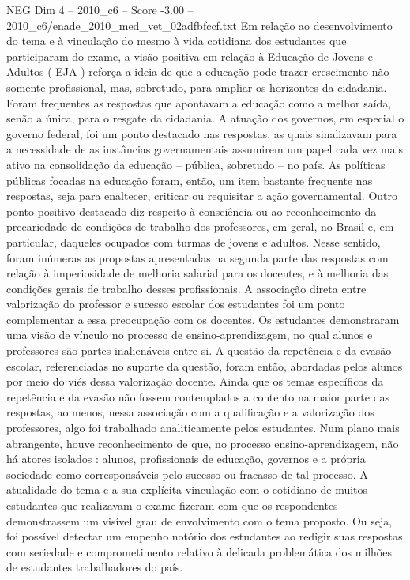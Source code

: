 \begin{textsample}{NEG Dim 4 – 2010\_c6 – Score -3.00 – 2010\_c6/enade\_2010\_med\_vet\_02adfbfccf.txt}
Em relação ao desenvolvimento do tema e à vinculação do mesmo à vida cotidiana dos estudantes que participaram do exame, a visão positiva em relação à Educação de Jovens e Adultos ( EJA ) reforça a ideia de que a educação pode trazer crescimento não somente profissional, mas, sobretudo, para ampliar os horizontes da cidadania.
Foram frequentes as respostas que apontavam a educação como a melhor saída, senão a única, para o resgate da cidadania.
A atuação dos governos, em especial o governo federal, foi um ponto destacado nas respostas, as quais sinalizavam para a necessidade de as instâncias governamentais assumirem um papel cada vez mais ativo na consolidação da educação – pública, sobretudo – no país.
As políticas públicas focadas na educação foram, então, um item bastante frequente nas respostas, seja para enaltecer, criticar ou requisitar a ação governamental.
Outro ponto positivo destacado diz respeito à consciência ou ao reconhecimento da precariedade de condições de trabalho dos professores, em geral, no Brasil e, em particular, daqueles ocupados com turmas de jovens e adultos.
Nesse sentido, foram inúmeras as propostas apresentadas na segunda parte das respostas com relação à imperiosidade de melhoria salarial para os docentes, e à melhoria das condições gerais de trabalho desses profissionais.
A associação direta entre valorização do professor e sucesso escolar dos estudantes foi um ponto complementar a essa preocupação com os docentes.
Os estudantes demonstraram uma visão de vínculo no processo de ensino-aprendizagem, no qual alunos e professores são partes inalienáveis entre si.
A questão da repetência e da evasão escolar, referenciadas no suporte da questão, foram então, abordadas pelos alunos por meio do viés dessa valorização docente.
Ainda que os temas específicos da repetência e da evasão não fossem contemplados a contento na maior parte das respostas, ao menos, nessa associação com a qualificação e a valorização dos professores, algo foi trabalhado analiticamente pelos estudantes.
Num plano mais abrangente, houve reconhecimento de que, no processo ensino-aprendizagem, não há atores isolados : alunos, profissionais de educação, governos e a própria sociedade como corresponsáveis pelo sucesso ou fracasso de tal processo.
A atualidade do tema e a sua explícita vinculação com o cotidiano de muitos estudantes que realizavam o exame fizeram com que os respondentes demonstrassem um visível grau de envolvimento com o tema proposto.
Ou seja, foi possível detectar um empenho notório dos estudantes ao redigir suas respostas com seriedade e comprometimento relativo à delicada problemática dos milhões de estudantes trabalhadores do país.

\end{textsample}

